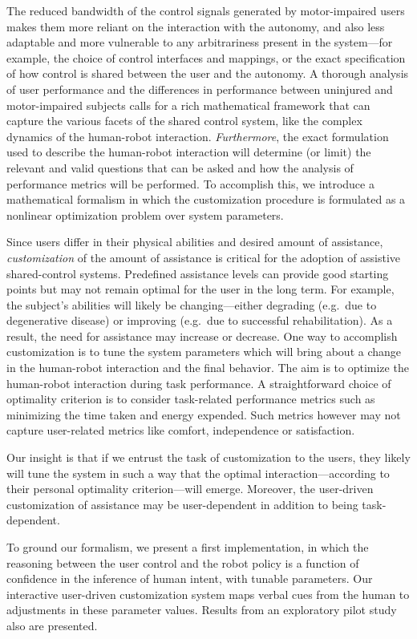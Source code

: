 \documentclass[letterpaper, 10 pt, journal, twoside]{IEEEtran}  %
\begin{document}
	The reduced bandwidth of the control signals generated by motor-impaired users makes them more reliant on the interaction with the autonomy, and also less adaptable and more vulnerable to any arbitrariness present in the system---for example, the choice of control interfaces and mappings, or the exact specification of how control is shared between the user and the autonomy. A thorough analysis of user performance and the differences in performance between uninjured and motor-impaired subjects calls for a rich mathematical framework that can capture the various facets of the shared control system, like the complex dynamics of the human-robot interaction. \textit{Furthermore}, the exact formulation used to describe the human-robot interaction will determine (or limit) the relevant and valid questions that can be 
	asked and how the analysis of performance metrics will be performed. To accomplish this, we introduce a mathematical formalism in which the customization procedure is formulated as a nonlinear optimization problem over system parameters. 
	
	Since users differ in their
	physical abilities and desired amount of assistance, \textit{customization} of the amount of assistance is critical for the adoption of assistive shared-control systems.
	Predefined assistance levels 
	can provide good starting points but may not remain optimal for the user in the long term. For example, the subject's abilities will likely be changing---either degrading (e.g.~due to degenerative disease) or improving (e.g.~due to successful rehabilitation). As a result, the need for assistance may increase or decrease. One way to accomplish customization is to tune the system parameters which will bring about a change in the human-robot interaction and the final behavior. The aim is to optimize the human-robot interaction during task performance. A straightforward choice of optimality criterion is to consider task-related performance metrics such as minimizing the time taken and energy expended. Such metrics however may not capture user-related metrics like comfort, independence or satisfaction.
	
	Our insight is that if we entrust the task of customization to the users, they likely will tune the system in such a way that the optimal interaction---according to their personal optimality criterion---will emerge. Moreover, the user-driven customization of assistance may be user-dependent in addition to being task-dependent. 
	
	To ground our formalism, we present a first implementation, in which the reasoning between the user control
	and the robot policy is a function of confidence in the inference of human intent, with tunable parameters. 
	Our interactive user-driven customization system maps verbal cues from the human to adjustments
	in these parameter values. Results from an exploratory pilot study also are presented.
	
\end{document}

